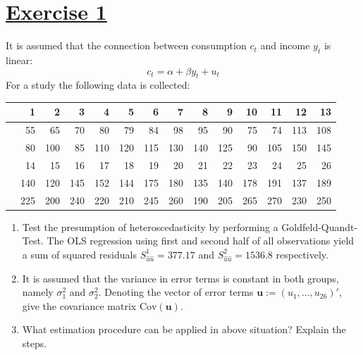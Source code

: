 \documentclass[captions=tableheading, 12pt, headings=small, parskip=half]{scrartcl}
\begin{document}
\section*{\underline{Exercise 1}}
It is assumed that the connection between consumption $c_t$ and income $y_t$ is linear:
\[c_t = \alpha + \beta y_t + u_t\]
For a study the following data is collected:
 \begin{table}[h!]
 	\centering
 	\begin{tabular}{cd{5.0}d{3.0}d{3.0}d{3.0}d{3.0}d{3.0}d{3.0}d{3.0}d{3.0}d{3.0}d{3.0}d{3.0}d{3.0}}
 		\toprule
 		\toprule
 		 & 1 & 2 & 3 & 4 & 5 & 6 & 7 & 8 & 9 & 10 & 11 & 12 & 13 \\ 
 		\midrule
 		 & 55 & 65 & 70 & 80 & 79 & 84 & 98 & 95 & 90 & 75 & 74 & 113 & 108 \\ 
 		 & 80 & 100 & 85 & 110 & 120 & 115 & 130 & 140 & 125 & 90 & 105 & 150 & 145 \\
 		\midrule
 		\midrule
 		 & 14 & 15 & 16 & 17 & 18 & 19 & 20 & 21 & 22 & 23 & 24 & 25 & 26 \\ 
 		\midrule
 		 & 140 & 120 & 145 & 152 & 144 & 175 & 180 & 135 & 140 & 178 & 191 & 137 & 189 \\ 
 		 & 225 & 200 & 240 & 220 & 210 & 245 & 260 & 190 & 205 & 265 & 270 & 230 & 250 \\ 
 		\bottomrule
 		\bottomrule
 	\end{tabular}
 \end{table}
\begin{enumerate}[label = \alph*)]
	\item Test the presumption of heteroscedasticity by performing a Goldfeld-Quandt-Test. The OLS regression using first and second half of all observations yield a sum of squared residuals $S_{\hat{u}\hat{u}}^1= 377.17$ and $S_{\hat{u}\hat{u}}^2= 1536.8$ respectively.
	\item It is assumed that the variance in error terms is constant in both groups, namely $\sigma^2_1$ and $\sigma^2_2$. Denoting the vector of error terms $\boldsymbol{u} := (u_1,...,u_{26})'$, give the covariance matrix $\text{Cov}(\boldsymbol{u})$.
	\item What estimation procedure can be applied in above situation? Explain the steps.
\end{enumerate}
\end{document}

